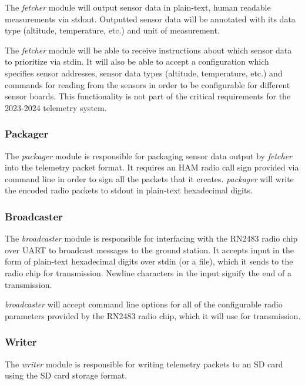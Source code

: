 The \textit{fetcher} module will output sensor data in plain-text, human readable measurements via \gls{stdout}.
Outputted sensor data will be annotated with its data type (altitude, temperature, etc.) and unit of measurement.

The \textit{fetcher} module will be able to receive instructions about which sensor data to prioritize via \gls{stdin}.
It will also be able to accept a configuration which specifies sensor addresses, sensor data types (altitude,
temperature, etc.) and commands for reading from the sensors in order to be configurable for different
 sensor boards. This functionality is not part of the critical requirements for the 2023-2024
telemetry system.

\subsubsection{Packager}

The \textit{packager} module is responsible for packaging sensor data output by \textit{fetcher} into the
 telemetry packet format. It requires an HAM radio call sign provided via command line in order
to sign all the packets that it creates. \textit{packager} will write the encoded radio packets to \gls{stdout} in
plain-text hexadecimal digits.

\subsubsection{Broadcaster}

The \textit{broadcaster} module is responsible for interfacing with the  RN2483 radio chip over UART
to broadcast messages to the ground station. It accepts input in the form of plain-text hexadecimal digits over
\gls{stdin} (or a file), which it sends to the radio chip for transmission. Newline characters in the input signify the
end of a transmission.

\textit{broadcaster} will accept command line options for all of the configurable radio parameters provided by the
RN2483 radio chip, which it will use for transmission.

\subsubsection{Writer}

The \textit{writer} module is responsible for writing  telemetry packets to an SD card using the
 SD card storage format.
